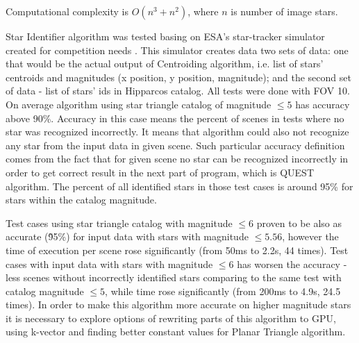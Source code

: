 \documentclass[12pt,a4paper,twoside]{article}
\begin{document}
Computational complexity is $O(n^3+n^2)$, where $n$ is number of image stars.

Star Identifier algorithm was tested basing on ESA's star-tracker simulator created for competition needs \cite{esa-competition}. This simulator creates data two sets of data: one that would be the actual output of Centroiding algorithm, i.e. list of stars' centroids and magnitudes (x position, y position, magnitude); and the second set of data - list of stars' ids in Hipparcos catalog.
All tests were done with FOV 10\degree . On average algorithm using star triangle catalog of magnitude $\leqslant 5$ has accuracy above 90\%. Accuracy in this case means the percent of scenes in tests where no star was recognized incorrectly. It means that algorithm could also not recognize any star from the input data in given scene.
Such particular accuracy definition comes from the fact that for given scene no star can be recognized incorrectly in order to get correct result in the next part of program, which is QUEST algorithm. The percent of all identified stars in those test cases is around 95\% for stars within the catalog magnitude.

Test cases using star triangle catalog with magnitude $\leqslant 6$ proven to be also as accurate (\~95\%) for input data with stars with magnitude $\leqslant 5.56$, however the time of execution per scene rose significantly (from 50ms to 2.2s, 44 times). Test cases with input data with stars with magnitude $\leqslant 6$ has worsen the accuracy - less scenes without incorrectly identified stars comparing to the same test with catalog magnitude $\leqslant 5$, while time rose significantly (from 200ms to 4.9s, 24.5 times). In order to make this algorithm more accurate on higher magnitude stars it is necessary to explore options of rewriting parts of this algorithm to GPU, using k-vector and finding better constant values for Planar Triangle algorithm.
\end{document}
